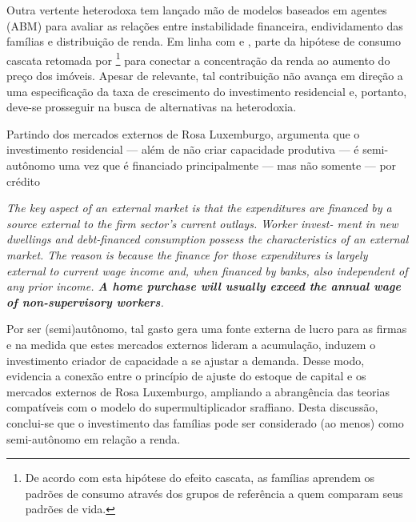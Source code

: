 Outra vertente heterodoxa tem lançado mão de modelos baseados em agentes (ABM) para avaliar as relações entre instabilidade financeira, endividamento das famílias e distribuição de renda.
Em linha com \textcite{cynamon_inequality_2013} e \textcite{erlingsson_integrating_2013}, \textcite{cardaci_inequality_2018} parte da hipótese de consumo cascata retomada por \textcite{frank_expenditure_2014}\footnote{
	De acordo com esta hipótese do efeito cascata, as famílias aprendem os padrões de consumo através dos grupos de referência a quem comparam seus padrões de vida.
} para conectar a concentração da renda ao aumento do preço dos imóveis.
Apesar de relevante, tal contribuição não avança em direção a uma especificação da taxa de crescimento do investimento residencial e, portanto, deve-se prosseguir na busca de alternativas na heterodoxia.

Partindo dos mercados externos de Rosa Luxemburgo, \textcite{fiebiger_semi-autonomous_2018} argumenta que o investimento residencial --- além de não criar capacidade produtiva --- é semi-autônomo uma vez que é financiado principalmente --- mas não somente --- por crédito

\begin{citacao}
	\textit{The key aspect of an external market is that the expenditures
		are financed by a source external to the firm sector’s current outlays. Worker invest-
		ment in new dwellings and debt-financed consumption possess the characteristics of
		an external market. The reason is because the finance for those expenditures is largely
		external to current wage income and, when financed by banks, also independent of any
		prior income. \textbf{A home purchase will usually exceed the annual wage of non-supervisory
			workers}.
	}
	\cite[p.~3, grifos adicionados]{fiebiger_semi-autonomous_2018}
\end{citacao}
Por ser (semi)autônomo, tal gasto gera uma fonte externa de lucro para as firmas e na medida que estes mercados externos lideram a acumulação, induzem o investimento criador de capacidade a se ajustar a demanda.
Desse modo, \textcite{fiebiger_semi-autonomous_2018} evidencia a conexão entre o princípio de ajuste do estoque de capital e os mercados externos de Rosa Luxemburgo, ampliando a abrangência das teorias compatíveis com o modelo do supermultiplicador sraffiano.
Desta discussão, conclui-se que o investimento das famílias pode ser considerado (ao menos) como semi-autônomo em relação a renda. 

